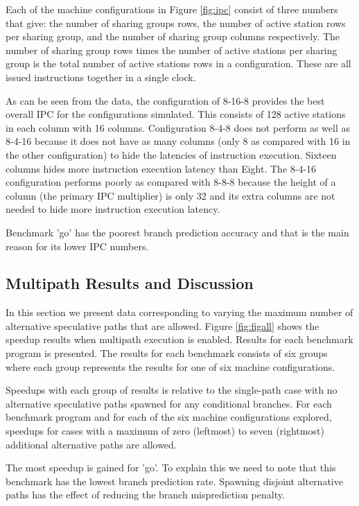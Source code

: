 \documentclass[10pt,dvips]{article}
\begin{document}
Each of the machine configurations in Figure \ref{fig:ipc} consist of
three numbers that give: the number of sharing groups rows, the number of
active station rows per sharing group, and the number of sharing group
columns respectively.  The number of sharing group rows times the number
of active stations per sharing group is the total number of active
stations rows in a configuration.  These are all issued instructions
together in a single clock.

As can be seen from the data, the configuration of 8-16-8 provides
the best overall IPC for the configurations simulated.  This consists
of 128 active stations in each column with 16 columns.
Configuration 8-4-8 does not perform as well as 8-4-16 because it does not
have as many columns (only 8 as compared with 16 in the other configuration)
to hide the latencies of instruction execution.  Sixteen columns 
hides more instruction execution latency than Eight.  The 8-4-16
configuration performs poorly as compared with 8-8-8 because the height
of a column (the primary IPC multiplier) is only 32 and its extra
columns are not needed to hide more instruction execution latency.

Benchmark 'go' has the poorest branch prediction accuracy and that is 
the main reason for its lower IPC numbers.  
%
\subsection{Multipath Results and Discussion}
%
In this section we present data corresponding to varying the
maximum number of alternative speculative paths that are allowed.
Figure \ref{fig:figall} shows the speedup results
when multipath execution is enabled.  Results for
each benchmark program is presented.  The results for each benchmark 
consists of six groups where each group represents the results
for one of six machine configurations.

Speedups with each group of results is relative to the
single-path case with no alternative speculative paths spawned
for any conditional branches.  For each benchmark program and
for each of the six machine configurations explored, speedups
for cases with a maximum
of zero (leftmost) to seven (rightmost) additional alternative 
paths are allowed.

The most speedup is gained for 'go'.  To explain this we need to note that 
this benchmark has the lowest branch prediction rate.  Spawning disjoint 
alternative paths has the effect of reducing the branch misprediction 
penalty.
\end{document}
